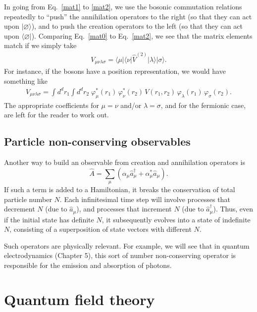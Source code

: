 \documentclass[prx,12pt]{revtex4-2}
\begin{document}
In going from Eq.~\eqref{mat1} to \eqref{mat2}, we use the bosonic
commutation relations repeatedly to ``push'' the annihilation
operators to the right (so that they can act upon
$|\varnothing\rangle$), and to push the creation operators to the left
(so that they can act upon $\langle\varnothing|$).  Comparing
Eq.~\eqref{mat0} to Eq.~\eqref{mat2}, we see that the matrix elements
match if we simply take
\begin{align}
  V_{\mu\nu\lambda\sigma} = \langle\mu|\langle\nu|\hat{V}^{(2)}
  |\lambda\rangle|\sigma\rangle.
\end{align}
For instance, if the bosons have a position representation, we would
have something like
\begin{align}
  V_{\mu\nu\lambda\sigma} =
  \int d^d r_1 \int d^d r_2\;
  \varphi_\mu^*(r_1) \,\varphi_\nu^*(r_2) \, V(r_1, r_2) \,
  \varphi_\lambda(r_1) \, \varphi_\sigma(r_2).
\end{align}
The appropriate coefficients for $\mu = \nu$ and/or $\lambda =
\sigma$, and for the fermionic case, are left for the reader to work
out.

\subsection{Particle non-conserving observables}
\label{sec:particle-nonconserving}

Another way to build an observable from creation and annihilation
operators is
\begin{equation}
  \hat{A} = \sum_\mu \left(\alpha_\mu \hat{a}_\mu^\dagger + \alpha^*_\mu \hat{a}_\mu\right).
\end{equation}
If such a term is added to a Hamiltonian, it breaks the conservation
of total particle number $N$.  Each infinitesimal time step will
involve processes that decrement $N$ (due to $\hat{a}_\mu$), and
processes that increment $N$ (due to $\hat{a}_\mu^\dagger$).  Thus,
even if the initial state has definite $N$, it subsequently evolves
into a state of indefinite $N$, consisting of a superposition of state
vectors with different $N$.

Such operators are physically relevant.  For example, we will see that
in quantum electrodynamics (Chapter 5), this sort of number
non-conserving operator is responsible for the emission and absorption
of photons.

\section{Quantum field theory}
\label{sec:qft}
\end{document}
